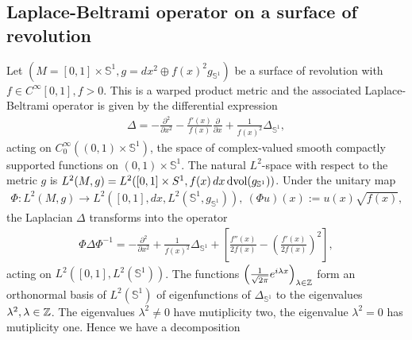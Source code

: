 \subsection{Laplace-Beltrami operator on a surface of revolution}
Let $(M=[0,1]\times \mathbb{S}^1, g=dx^2\oplus f(x)^2 g_{\mathbb{S}^1})$ be a surface of revolution with 
$f\in C^{\infty}[0,1], f > 0$. This is a warped product metric and the associated Laplace-Beltrami operator is given 
by the differential expression 
\begin{align}
\Delta = -\frac{\partial^2}{\partial x^2} - 
\frac{f'(x)}{f(x)} \frac{\partial}{\partial x} + \frac{1}{f(x)^2} \Delta_{\mathbb{S}^1},
\end{align}
acting on $C^{\infty}_0((0,1) \times \mathbb{S}^1)$, the 
space of complex-valued smooth compactly supported functions on $(0,1)\times 
\mathbb{S}^1$. The natural $L^2$-space with respect to the metric $g$ 
is $L^2(M,g)=L^2([0,1]\times S^1, f(x)\, dx\, \textup{dvol}(g_{\mathbb{S}^1}))$.
Under the unitary map
\begin{align}
\label{unitary}
\Phi: L^2(M,g) \to L^2([0,1], dx, L^2(\mathbb{S}^1,g_{\mathbb{S}^1})), 
\ (\Phi u)(x):= u(x)\sqrt{f(x)},
\end{align}
the Laplacian $\Delta$ transforms into the operator
\begin{align*}
\Phi \Delta \Phi^{-1} = -\frac{\partial^2}{\partial x^2} + \frac{1}{f(x)^2} \Delta_{\mathbb{S}^1} 
+ \left[\frac{f''(x)}{2f(x)} - \left(\frac{f'(x)}{2f(x)}\right)^2\right], 
\end{align*}
acting on $L^2([0,1],L^2(\mathbb{S}^1))$.
The functions $\left(\frac{1}{\sqrt{2\pi}}e^{i\lambda x}\right)_{\lambda \in \mathbb{Z}}$
form an orthonormal basis of $L^2(\mathbb{S}^1)$ of eigenfunctions 
of $\Delta_{\mathbb{S}^1}$ to the eigenvalues $\lambda^2, \lambda \in \mathbb{Z}$. 
The eigenvalues $\lambda^2\neq 0$ have mutiplicity two, the eigenvalue $\lambda^2=0$ has mutiplicity one. 
Hence we have a decomposition

